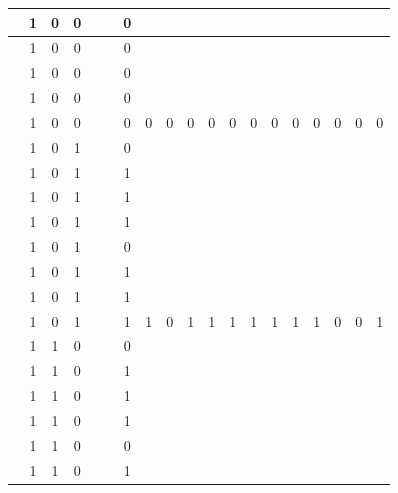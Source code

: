 \begin{table}[!tb]
\begin{tabular}{|c|c|c|c|c|c|c|c|c|c|c|c|c|c|c|c|c|c|c|}
        \rowcolor{yellow!40}  & 1 & 0 & 0 &  &  & 0 &  &  &  &  &  &  &  &  &  &  &  &  \\ \hline
        \rowcolor{yellow!40}  & 1 & 0 & 0 &  &  & 0 &  &  &  &  &  &  &  &  &  &  &  &  \\ \hline
        \rowcolor{yellow!40}  & 1 & 0 & 0 &  &  & 0 &  &  &  &  &  &  &  &  &  &  &  &  \\ \hline
        \rowcolor{yellow!40}  & 1 & 0 & 0 &  &  & 0 &  &  &  &  &  &  &  &  &  &  &  &  \\ \hline
        \rowcolor{yellow!40}  & 1 & 0 & 0 &  &  & 0 & 0 & 0 & 0 & 0 & 0 & 0 & 0 & 0 & 0 & 0 & 0 & 0 \\ \hline
        \rowcolor{gray!40}  & 1 & 0 & 1 &  &  & 0 &  &  &  &  &  &  &  &  &  &  &  &  \\ \hline
        \rowcolor{gray!40}  & 1 & 0 & 1 &  &  & 1 &  &  &  &  &  &  &  &  &  &  &  &  \\ \hline
        \rowcolor{gray!40}  & 1 & 0 & 1 &  &  & 1 &  &  &  &  &  &  &  &  &  &  &  &  \\ \hline
        \rowcolor{gray!40}  & 1 & 0 & 1 &  &  & 1 &  &  &  &  &  &  &  &  &  &  &  &  \\ \hline
        \rowcolor{gray!40}  & 1 & 0 & 1 &  &  & 0 &  &  &  &  &  &  &  &  &  &  &  &  \\ \hline
        \rowcolor{gray!40}  & 1 & 0 & 1 &  &  & 1 &  &  &  &  &  &  &  &  &  &  &  &  \\ \hline
        \rowcolor{gray!40}  & 1 & 0 & 1 &  &  & 1 &  &  &  &  &  &  &  &  &  &  &  &  \\ \hline
        \rowcolor{gray!40}  & 1 & 0 & 1 &  &  & 1 & 1 & 0 & 1 & 1 & 1 & 1 & 1 & 1 & 1 & 0 & 0 & 1 \\ \hline
        \rowcolor{blue!40}  & 1 & 1 & 0 &  &  & 0 &  &  &  &  &  &  &  &  &  &  &  &  \\ \hline
        \rowcolor{blue!40}  & 1 & 1 & 0 &  &  & 1 &  &  &  &  &  &  &  &  &  &  &  &  \\ \hline
        \rowcolor{blue!40}  & 1 & 1 & 0 &  &  & 1 &  &  &  &  &  &  &  &  &  &  &  &  \\ \hline
        \rowcolor{blue!40}  & 1 & 1 & 0 &  &  & 1 &  &  &  &  &  &  &  &  &  &  &  &  \\ \hline
        \rowcolor{blue!40}  & 1 & 1 & 0 &  &  & 0 &  &  &  &  &  &  &  &  &  &  &  &  \\ \hline
        \rowcolor{blue!40}  & 1 & 1 & 0 &  &  & 1 &  &  &  &  &  &  &  &  &  &  &  &  \\ \hline

\end{tabular}
\end{table}
